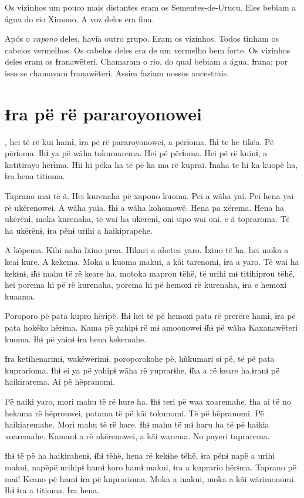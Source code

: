 Os vizinhos um pouco mais distantes eram os Sementes-de-Urucu. Eles
bebiam a água do rio Ximono. A voz deles era fina. 

Após o \textit{xapono} deles, havia outro grupo. Eram os vizinhos. Todos tinham
os cabelos vermelhos. Os cabelos deles era de um vermelho bem forte. Os
vizinhos deles eram os Ɨranawëteri. Chamaram o rio, do qual bebiam a
água, Ɨrana; por isso se chamavam Ɨranawëteri. Assim faziam nossos
ancestrais.

\chapter{Ɨra pë rë pararoyonowei}
 
, hei të rë kui hamɨ, ɨra pë rë pararoyonowei, a përɨoma. Ɨhɨ te
he tikëa. Pë përɨoma. Ɨhɨ ya pë wãha tokumarema. Hei pë përɨoma. Hei pë
rë kuinɨ, a katitirayo hërɨma. Hii hi pëka ha të pë ka ma rë kuprai.
Ɨnaha te hi ka kuopë ha, ɨra hena titioma. 

Taprano mai të ã. Hei kurenaha pë xapono kuoma. Pei a wãha yai. Pei hena
yai rë ukërenowei. A wãha yaia. Ɨhɨ a wãha kohomowë. Hena pa xërema.
Hena ha ukërënɨ, moka kurenaha, të wai ha ukërënɨ, oni sipo wai oni, e ã
topraroma. Të ha ukërënɨ, ɨra pënɨ urihi a haikiprapehe. 

A kõpema. Kihi naha ĩxino praa. Hikari a ahetea yaro. Ĩxino të ha, hei
 moka a keaɨ kure. A kekema. Moka a kuoma makui, a kãi tarenomi, ɨra a
 yaro. Të wai ha kekɨnɨ, ɨ̃hɨ mahu të rë keare ha, motoka maprou tëhë, të
 urihi mɨ titihiprou tëhë, hei porema hi pë rë kurenaha, porema hi pë
 hemoxi rë kurenaha, ɨra e hemoxi kuaama.

Poroporo pë pata kupro hërɨpë. Ɨhɨ hei të pë hemoxi pata rë prerëre
 hamɨ, ɨra pë pata hokëko hërɨma. Kama pë yahipɨ rë mɨ amoonowei ɨ̃hɨ pë
 wãha Kaxanawëteri kuoma. Ɨhɨ pë yainɨ ɨra hena kekemahe.

Ɨra ketihenarimɨ, wakëwërimɨ, poroporokohe pë, hũkumari si pë, të pë
 pata kuprarioma. Ɨhɨ ei ya pë yahipɨ wãha rë yuprarɨhe, ɨ̃ha a rë keare
 ha,ɨranɨ pë haikirarema. Ai pë hëpranomi. 

Pë naiki yaro, mori mahu të rë hure ha. Ɨhɨ teri pë waa xoaremahe. Ɨha
ai të no hekama rë hëprouwei, patama të pë kãi tokunomi. Të pë
hëpranomi. Pë haikiaremahe. Mori mahu të rë hare. Ɨhɨ mahu të mɨ haru ha
të pë haikia xoaremahe. Kamanɨ a rë ukërenowei, a kãi warema. No payeri
taprarema. 

Ɨhɨ të pë ha haikirahenɨ, ɨ̃hɨ tëhë, hena rë kekɨhe tëhë, ɨra pënɨ napë a
 urihi makui, napëpë urihipɨ hamɨ koro hamɨ makui, ɨra a kuprario hërɨma.
 Taprano pë mai! Keano pë hamɨ ɨra pë kuprarioma. Moka a makui, moka a
 kãi wãrimonomi. Ɨhɨ ɨra a titioma. Ɨra hena.

